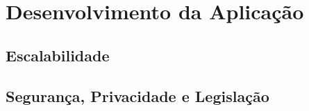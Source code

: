 \chapter{Desenvolvimento da Aplicação}







%



\section{Escalabilidade}

\section{Segurança, Privacidade e Legislação}

